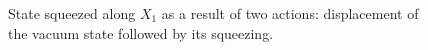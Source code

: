 \begin{figure}
\centering



\caption{State squeezed along $X_1$ as a result of two actions:
  displacement of the vacuum state followed by its squeezing.}
\label{figPart3Squeezed_7}
\end{figure}